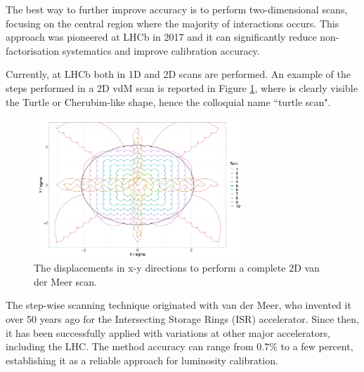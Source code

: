 The best way to further improve accuracy is to perform two-dimensional scans, focusing on the central region where the majority of interactions occurs. This approach was pioneered at LHCb in 2017 and it can significantly reduce non-factorisation systematics and improve calibration accuracy\cite{Balagura_2021}.

Currently, at LHCb both in 1D and 2D scans are performed. An example of the steps performed in a 2D vdM scan is reported in Figure \ref{fig:vdm_steps_xy}, where is clearly visible the Turtle or Cherubim-like shape, hence the colloquial name ``turtle scan".

\begin{figure}
    \centering
    \includegraphics[width=0.7\textwidth]{figures/vdm_steps_xy.png}
    \caption{The displacements in x-y directions to perform a complete 2D van der Meer scan.}
    \label{fig:vdm_steps_xy}
\end{figure}



The step-wise scanning technique originated with van der Meer, who invented it over 50 years ago for the Intersecting Storage Rings (ISR) accelerator\cite{Carboni:156499}. Since then, it has been successfully applied with variations at other major accelerators\cite{Rubbia:1025746}, including the LHC. The method accuracy can range from 0.7\% to a few percent, establishing it as a reliable approach for luminosity calibration.


